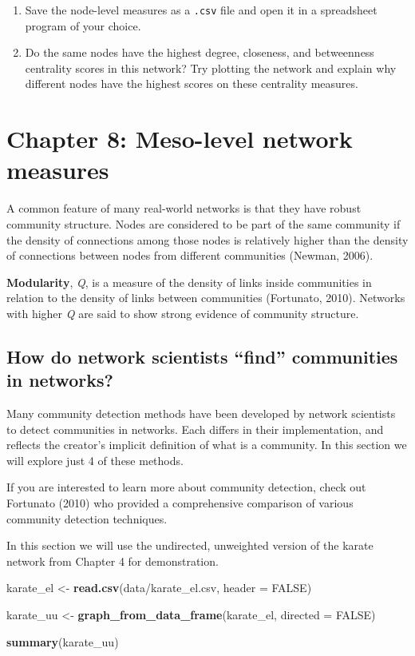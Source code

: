 \documentclass[
]{book}
\newenvironment{Shaded}{\begin{snugshade}}{\end{snugshade}}
\newcommand{\AttributeTok}[1]{\textcolor[rgb]{0.13,0.29,0.53}{#1}}
\newcommand{\ConstantTok}[1]{\textcolor[rgb]{0.56,0.35,0.01}{#1}}
\newcommand{\FunctionTok}[1]{\textcolor[rgb]{0.13,0.29,0.53}{\textbf{#1}}}
\newcommand{\NormalTok}[1]{#1}
\newcommand{\OtherTok}[1]{\textcolor[rgb]{0.56,0.35,0.01}{#1}}
\newcommand{\StringTok}[1]{\textcolor[rgb]{0.31,0.60,0.02}{#1}}
\begin{document}
\begin{enumerate}
\def\labelenumi{\arabic{enumi}.}
\setcounter{enumi}{2}
\item
  Save the node-level measures as a \texttt{.csv} file and open it in a spreadsheet program of your choice.
\item
  Do the same nodes have the highest degree, closeness, and betweenness centrality scores in this network? Try plotting the network and explain why different nodes have the highest scores on these centrality measures.
\end{enumerate}

\chapter{Chapter 8: Meso-level network measures}\label{ch8}

A common feature of many real-world networks is that they have robust community structure. Nodes are considered to be part of the same community if the density of connections among those nodes is relatively higher than the density of connections between nodes from different communities (Newman, 2006).

\textbf{Modularity}, \emph{Q}, is a measure of the density of links inside communities in relation to the density of links between communities (Fortunato, 2010). Networks with higher \emph{Q} are said to show strong evidence of community structure.

\section{How do network scientists ``find'' communities in networks?}\label{how-do-network-scientists-find-communities-in-networks}

Many community detection methods have been developed by network scientists to detect communities in networks. Each differs in their implementation, and reflects the creator's implicit definition of what is a community. In this section we will explore just 4 of these methods.

If you are interested to learn more about community detection, check out Fortunato (2010) who provided a comprehensive comparison of various community detection techniques.

In this section we will use the undirected, unweighted version of the karate network from Chapter 4 for demonstration.

\begin{Shaded}
\begin{Highlighting}[]
\NormalTok{karate\_el }\OtherTok{\textless{}{-}} \FunctionTok{read.csv}\NormalTok{(}\StringTok{\textquotesingle{}data/karate\_el.csv\textquotesingle{}}\NormalTok{, }\AttributeTok{header =} \ConstantTok{FALSE}\NormalTok{)}

\NormalTok{karate\_uu }\OtherTok{\textless{}{-}} \FunctionTok{graph\_from\_data\_frame}\NormalTok{(karate\_el, }\AttributeTok{directed =} \ConstantTok{FALSE}\NormalTok{)}

\FunctionTok{summary}\NormalTok{(karate\_uu)}
\end{Highlighting}
\end{Shaded}
\end{document}
